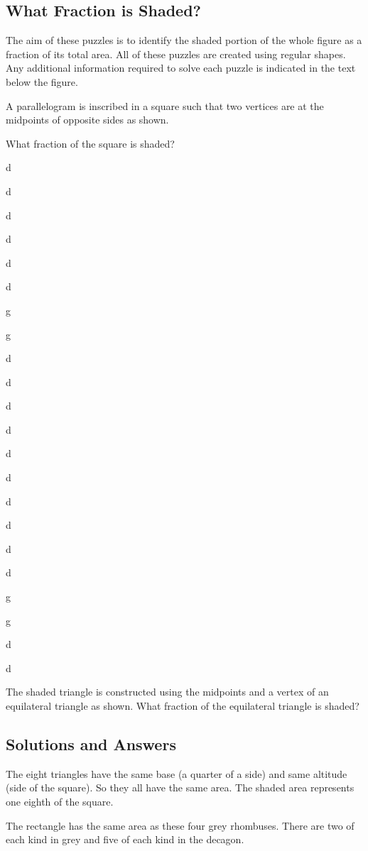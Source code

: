 \documentclass{tarquinst}
\begin{document}
	
\begin{changemargin}	
\chapter{What Fraction is Shaded?}	


The aim of these puzzles is to identify the shaded portion of the
whole figure as a fraction of its total area. All of these puzzles are
created using regular shapes. Any additional information required
to solve each puzzle is indicated in the text below the figure.
\end{changemargin}

\newpage 

\noindent 
{}\quad 


A parallelogram is inscribed in a square such that two vertices are at
the midpoints of opposite sides as shown.

\noindent
What fraction of the square is shaded?

d

d

d

d

d

d

g

g

d

d

d

d

d

d

d

d

d


d

g

g

d

d

\newpage

\noindent
{}\quad
The shaded triangle is constructed using the midpoints and a vertex
of an equilateral triangle as shown.
What fraction of the equilateral triangle is shaded?

\newpage 

\begin{changemargin}
\chapter{Solutions and Answers}

\end{changemargin}

\newpage

\noindent 
{}\quad 
The eight triangles have the same base (a quarter of a side) and same altitude (side of
the square). So they all have the same area. The shaded area represents one eighth of the
square.
	
\newpage


\noindent 
{}\quad 
The rectangle has the same area as these
four grey rhombuses. There are two of
each kind in grey and five of each kind in
the decagon.

	
\end{document}
